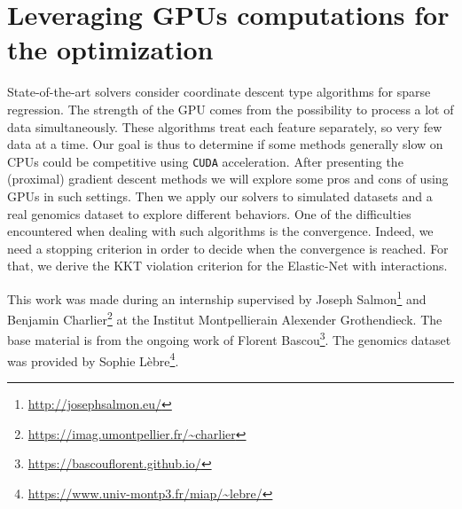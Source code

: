 \documentclass[../main.tex]{subfiles}
\begin{document}
\section{Leveraging GPUs computations for the optimization}
\label{sec:levering_gpus_computations_for_optimization}

State-of-the-art solvers consider coordinate descent type algorithms for sparse
regression.
The strength of the GPU comes from the possibility to process a lot of data
simultaneously.
These algorithms treat each feature separately, so very few data at a time.
Our goal is thus to determine if some methods generally slow on CPUs could be
competitive using \texttt{CUDA} acceleration.
After presenting the (proximal) gradient descent methods
we will explore some pros and cons of using GPUs in such settings.
Then we apply our solvers to simulated datasets and a real genomics dataset to
explore different behaviors.
One of the difficulties encountered when dealing with such algorithms is the
convergence.
Indeed, we need a stopping criterion in order to decide when the convergence
is reached.
For that, we derive the KKT violation criterion for the Elastic-Net with
interactions.

\medskip

This work was made during an internship supervised by
Joseph Salmon\footnote{\url{http://josephsalmon.eu/}} and
Benjamin Charlier\footnote{\url{https://imag.umontpellier.fr/~charlier}}
at the Institut Montpellierain Alexender Grothendieck.
The base material is from the ongoing work of Florent Bascou\footnote{\url{https://bascouflorent.github.io/}}.
The genomics dataset was provided by Sophie Lèbre\footnote{\url{https://www.univ-montp3.fr/miap/~lebre/}}.
\end{document}
